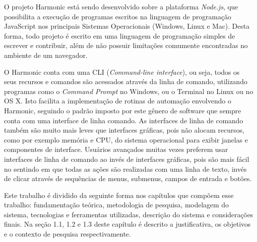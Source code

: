 \documentclass[ppginf, pep]{esinucpel}
\begin{document}
O projeto Harmonic está sendo desenvolvido sobre a plataforma \emph{Node.js}, que possibilita a execução de programas escritos na linguagem de programação JavaScript nos principais Sistemas Operacionais (Windows, Linux e Mac). Desta forma, todo projeto é escrito em uma linguagem de programação simples de escrever e contribuir, além de não possuir limitações comumente encontradas no ambiente de um navegador.

O Harmonic conta com uma CLI (\textit{Command-line interface}), ou seja, todos os seus recursos e comandos são acessados através da linha de comando, utilizando programas como o \textit{Command Prompt} no Windows, ou o Terminal no Linux ou no OS X. Isto facilita a implementação de rotinas de automação envolvendo o Harmonic, seguindo o padrão imposto por este gênero de software que sempre conta com uma interface de linha comando. As interfaces de linha de comando também são muito mais leves que interfaces gráficas, pois não alocam recursos, como por exemplo memória e CPU, do sistema operacional para exibir janelas e componentes de interface. Usuários avançados muitas vezes preferem usar interfaces de linha de comando ao invés de interfaces gráficas, pois são mais fácil no sentindo em que todas as ações são realizadas com uma linha de texto, invés de clicar através de sequências de menus, submenus, campos de entrada e botões.



Este trabalho é dividido da seguinte forma nos capítulos que compõem esse trabalho: fundamentação teórica, metodologia de pesquisa, modelagem do sistema, tecnologias e ferramentas utilizadas, descrição do sistema e considerações finais. Na seção 1.1, 1.2 e 1.3 deste capítulo é descrito a justificativa, os objetivos e o contexto de pesquisa respectivamente.
\end{document}
